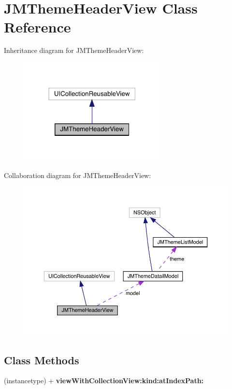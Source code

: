 \hypertarget{interface_j_m_theme_header_view}{}\section{J\+M\+Theme\+Header\+View Class Reference}
\label{interface_j_m_theme_header_view}


Inheritance diagram for J\+M\+Theme\+Header\+View\+:\nopagebreak
\begin{figure}[H]
\begin{center}
\leavevmode
\includegraphics[width=214pt]{interface_j_m_theme_header_view__inherit__graph}
\end{center}
\end{figure}


Collaboration diagram for J\+M\+Theme\+Header\+View\+:\nopagebreak
\begin{figure}[H]
\begin{center}
\leavevmode
\includegraphics[width=350pt]{interface_j_m_theme_header_view__coll__graph}
\end{center}
\end{figure}
\subsection*{Class Methods}
\begin{DoxyCompactItemize}
\item 
\mbox{\label{interface_j_m_theme_header_view_ae7ffcd34179e15a53b0e4c06466feca3}} 
(instancetype) + {\bfseries view\+With\+Collection\+View\+:kind\+:at\+Index\+Path\+:}
\end{DoxyCompactItemize}

